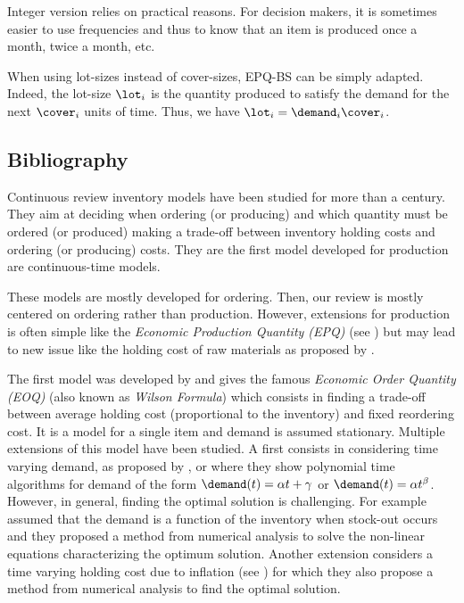 Integer version relies on practical reasons.
For decision makers, it is sometimes easier to use frequencies and thus to know that an item is produced once a month, twice a month, etc.


\medskip


When using lot-sizes instead of cover-sizes, EPQ-BS can be simply adapted.
Indeed, the lot-size $\lot_i$ is the quantity produced to satisfy the demand for the next $\cover_i$ units of time.
Thus, we have $\lot_i=\demand_i\cover_i$.


\subsection{Bibliography}
\label{sec:lot-size:single-line:deterministic:bibliography}


Continuous review inventory models have been studied for more than a century.
They aim at deciding when ordering (or producing) and which quantity must be ordered (or produced) making a trade-off between inventory holding costs and ordering (or producing) costs.
They are the first model developed for production are continuous-time models.


These models are mostly developed for ordering.
Then, our review is mostly centered on ordering rather than production. 
However, extensions for production is often simple like the \emph{Economic Production Quantity (EPQ)} (see \citet{Taft1918}) but may lead to new issue like the holding cost of raw materials as proposed by \citet{Lin2013}.


The first model was developed by \citet{Harris1913} and gives the famous \emph{Economic Order Quantity (EOQ)} (also known as \emph{Wilson Formula}) which consists in finding a trade-off between average holding cost (proportional to the inventory) and fixed reordering cost.
It is a model for a single item and demand is assumed stationary.
Multiple extensions of this model have been studied.
A first consists in considering time varying demand, as proposed by \citet{Resh1976}, \citet{Donaldson1977} or \citet{Barbosa1978} where they show polynomial time algorithms for demand of the form $\demand(t)=\alpha t+\gamma$ or $\demand(t)=\alpha t^{\beta}$.
However, in general, finding the optimal solution is challenging.
For example \citet{Padmanabhan1990} assumed that the demand is a function of the inventory when stock-out occurs and they proposed a method from numerical analysis to solve the non-linear equations characterizing the optimum solution.
Another extension considers a time varying holding cost due to inflation (see \citet{Vrat1990}) for which they also propose a method from numerical analysis to find the optimal solution.


